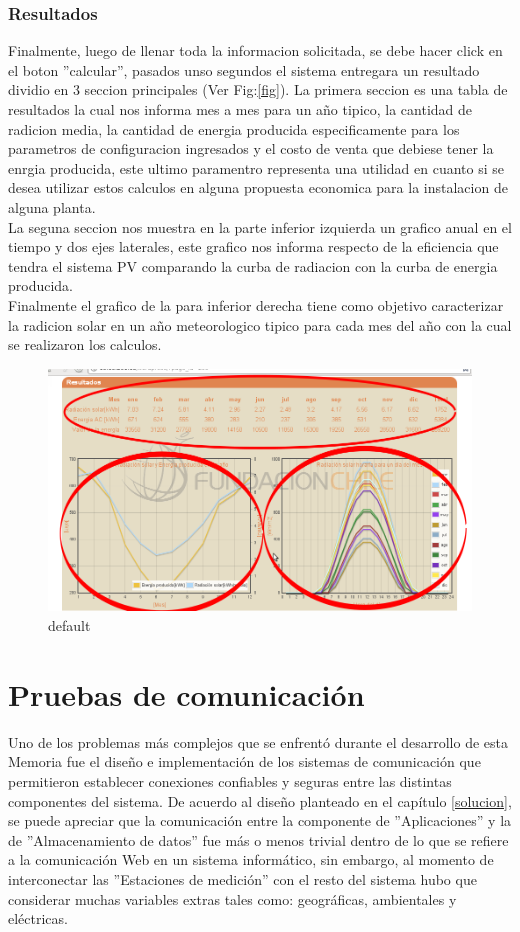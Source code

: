 \subsubsection{Resultados}
Finalmente, luego de llenar toda la informacion solicitada, se debe hacer click en el boton ''calcular'', pasados unso segundos el sistema entregara un resultado dividio en 3 seccion principales (Ver Fig:\ref{fig}). La primera seccion es una tabla de resultados la cual nos informa mes a mes para un año tipico, la cantidad de radicion media, la cantidad de energia producida especificamente para los parametros de configuracion ingresados y el costo de venta que debiese tener la enrgia producida, este ultimo paramentro representa una utilidad en cuanto si se desea utilizar estos calculos en alguna propuesta economica para la instalacion de alguna planta.\\ La seguna seccion nos muestra en la parte inferior izquierda un grafico anual en el tiempo y dos ejes laterales, este grafico nos informa respecto de la eficiencia que tendra el sistema PV comparando la curba de radiacion con la curba de energia producida.\\ Finalmente el grafico de la para inferior derecha tiene como objetivo caracterizar la radicion solar en un año meteorologico tipico para cada mes del año con la cual se realizaron los calculos.
\begin{figure}[ht]
        \centering
        \includegraphics[width=\textwidth]{./images/cap5chap1img9}
        \caption{default}
        \label{fig:figure1}
\end{figure}

\section{Pruebas de comunicación}
Uno de los problemas más complejos que se enfrentó durante el desarrollo de esta Memoria fue el diseño e implementación de los sistemas de comunicación que permitieron establecer conexiones confiables y seguras entre las distintas componentes del sistema. De acuerdo al diseño planteado en el capítulo \ref{solucion}, se puede apreciar que la comunicación entre la componente de ''Aplicaciones'' y la de ''Almacenamiento de datos'' fue más o menos trivial dentro de lo que se refiere a la comunicación Web en un sistema informático, sin embargo, al momento de interconectar las ''Estaciones de medición'' con el resto del sistema hubo que considerar muchas variables extras tales como: geográficas, ambientales y eléctricas.

